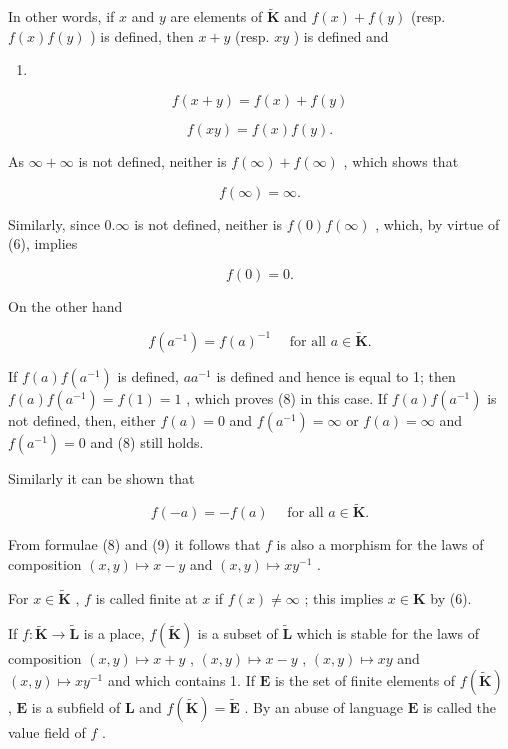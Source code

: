 In other words, if \(x\) and \(y\) are elements of \(\tilde{\mathbf{K}}\) and \(f(x) + f(y)\) (resp. \(f(x)f(y)\) ) is defined, then \(x + y\) (resp. \(xy\) ) is defined and

\begin{enumerate}
\def\labelenumi{(\arabic{enumi})}
\setcounter{enumi}{3}
\tightlist
\item
\end{enumerate}

\[
f (x + y) = f (x) + f (y)\tag{4}
\]

\[
f (x y) = f (x) f (y).\tag{5}
\]

As \(\infty +\infty\) is not defined, neither is \(f(\infty) + f(\infty)\) , which shows that

\[
f (\infty) = \infty .\tag{6}
\]

Similarly, since \(0.\infty\) is not defined, neither is \(f(0)f(\infty)\) , which, by virtue of (6), implies

\[
f (0) = 0.\tag{7}
\]

On the other hand

\[
f (a ^ {- 1}) = f (a) ^ {- 1} \quad \text {   for   all   } a \in \tilde {\mathbf {K}}.\tag{8}
\]

If \(f(a)f(a^{-1})\) is defined, \(aa^{-1}\) is defined and hence is equal to 1; then \(f(a)f(a^{-1}) = f(1) = 1\) , which proves (8) in this case. If \(f(a)f(a^{-1})\) is not defined, then, either \(f(a) = 0\) and \(f(a^{-1}) = \infty\) or \(f(a) = \infty\) and \(f(a^{-1}) = 0\) and (8) still holds.

Similarly it can be shown that

\[
f (- a) = - f (a) \quad \text {   for   all   } a \in \tilde {\mathbf {K}}.\tag{9}
\]

From formulae (8) and (9) it follows that \(f\) is also a morphism for the laws of composition \((x, y) \mapsto x - y\) and \((x, y) \mapsto xy^{-1}\) .

For \(x \in \tilde{\mathbf{K}}\) , \(f\) is called finite at \(x\) if \(f(x) \neq \infty\) ; this implies \(x \in \mathbf{K}\) by (6).

If \(f \colon \tilde{\mathbf{K}} \to \tilde{\mathbf{L}}\) is a place, \(f(\tilde{\mathbf{K}})\) is a subset of \(\tilde{\mathbf{L}}\) which is stable for the laws of composition \((x, y) \mapsto x + y\) , \((x, y) \mapsto x - y\) , \((x, y) \mapsto xy\) and \((x, y) \mapsto xy^{-1}\) and which contains 1. If \(\mathbf{E}\) is the set of finite elements of \(f(\tilde{\mathbf{K}})\) , \(\mathbf{E}\) is a subfield of \(\mathbf{L}\) and \(f(\tilde{\mathbf{K}}) = \tilde{\mathbf{E}}\) . By an abuse of language \(\mathbf{E}\) is called the value field of \(f\) .

